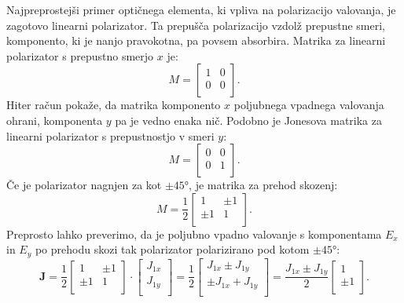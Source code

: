Najpreprostejši
primer optičnega elementa, ki vpliva na polarizacijo valovanja,
je zagotovo linearni polarizator. Ta prepušča
polarizacijo vzdolž prepustne smeri, komponento, ki
je nanjo pravokotna, pa povsem absorbira. Matrika za
linearni polarizator s prepustno smerjo $x$ je:
\begin{equation}
M = \left[\begin{array}{cc}
1 & 0 \\
0 & 0\\
\end{array}\right]\!\!.
\label{eq:03_481}
\end{equation}
Hiter račun pokaže, da matrika komponento $x$ poljubnega 
vpadnega valovanja ohrani, komponenta $y$ pa je vedno enaka nič. 
Podobno je Jonesova matrika za linearni polarizator s prepustnostjo
v smeri $y$:
\begin{equation}
M = \left[\begin{array}{cc}
0 & 0 \\
0 & 1\\
\end{array}\right]\!\!.
\label{eq:03_49}
\end{equation}
Če je polarizator nagnjen za kot $\pm45\si{\degree}$, je matrika
za prehod skozenj:
\begin{equation}
M = \frac{1}{2}\left[\begin{array}{cc}
1 & \pm 1 \\
\pm 1 & 1\\
\end{array}\right]\!\!.
\label{eq:03_50}
\end{equation}
Preprosto lahko preverimo, da je poljubno vpadno valovanje s komponentama
$E_x$ in $E_y$ po prehodu skozi tak polarizator polarizirano 
pod kotom $\pm45\si{\degree}$:
\begin{equation}
\mathbf{J} = \frac{1}{2}\left[\begin{array}{cc}
1 & \pm 1 \\
\pm 1 & 1\\
\end{array}\right]\cdot 
\left[\begin{array}{c}
J_{1x}\\
J_{1y}\\
\end{array}\right]\!\! = 
\frac{1}{2}\left[\begin{array}{c}
J_{1x} \pm J_{1y}\\
\pm J_{1x} + J_{1y}\\
\end{array}\right]\!\!=
\frac{J_{1x}\pm J_{1y}}{2}\left[\begin{array}{c}
1\\
\pm 1\\
\end{array}\right]\!\!.
\label{eq:03_51}
\end{equation}
